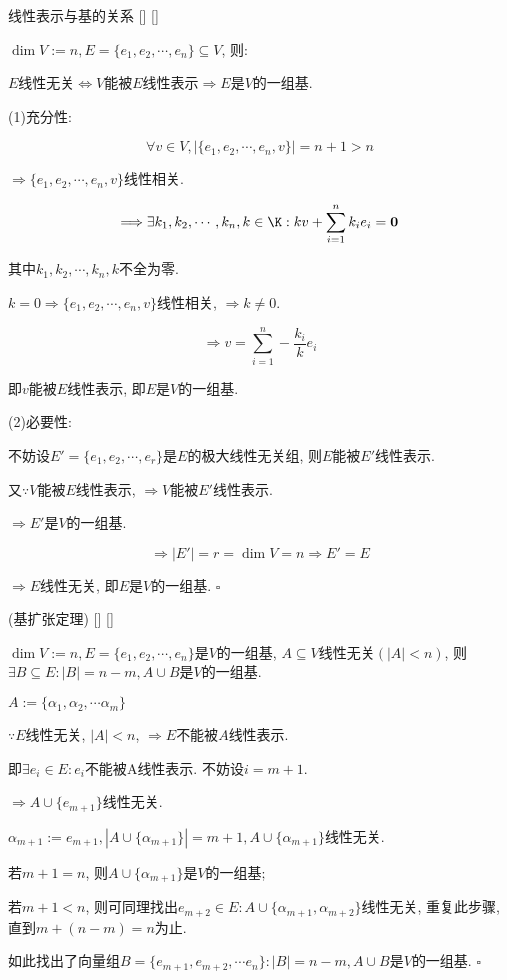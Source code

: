 \documentclass[UTF8]{ctexart}
\begin{document}
		\begin{ppt}
			[]
			{线性表示与基的关系}
			[]
			[]

			$\dim V:=n, E=\{e_{1},e_{2},\cdots,e_{n}\}\subseteq V$, 则: 
			
			$E$线性无关$\Longleftrightarrow V$能被$E$线性表示$\Longrightarrow E$是$V$的一组基. 
		\end{ppt}
		\begin{prf}
			
			(1)充分性: 
			
			$$\forall v\in V, |\{e_{1},e_{2},\cdots,e_{n}, v\}|=n+1>n$$
			
			$\Longrightarrow \{e_{1},e_{2},\cdots,e_{n}, v\}$线性相关. 
			
			$$\Longrightarrow \exists k_{1},k_{2},\cdots,k_{n},k\in\K: kv+\sum_{i=1}^{n}k_{i}e_{i}=\mathbf{0}$$
			
			其中$k_{1},k_{2},\cdots,k_{n},k$不全为零. 
			
			$k=0\Longrightarrow\{e_{1},e_{2},\cdots,e_{n}, v\}$线性相关, $\Longrightarrow k\neq 0$. 
			
			$$\Longrightarrow v=\sum_{i=1}^{n}-\frac{k_{i}}{k}e_{i}$$
			
			即$v$能被$E$线性表示, 即$E$是$V$的一组基. 
			
			(2)必要性: 
			
			不妨设$E'=\{e_{1},e_{2},\cdots,e_{r}\}$是$E$的极大线性无关组, 则$E$能被$E'$线性表示. 
			
			又$\because V$能被$E$线性表示, $\Longrightarrow V$能被$E'$线性表示. 
			
			$\Longrightarrow E'$是$V$的一组基. 
			
			$$\Longrightarrow |E'|=r=\dim V=n\Longrightarrow E'=E$$
			
			$\Longrightarrow E$线性无关, 即$E$是$V$的一组基. $\square$
		\end{prf}
		\begin{thm}
			[]
			{(基扩张定理)}
			[]
			[]

            $\dim V:=n, E=\{e_{1},e_{2},\cdots, e_{n}\}$是$V$的一组基, $A\subseteq V$线性无关$(|A|<n)$, 则$\exists B\subseteq E: |B|=n-m, A\cup B$是$V$的一组基. 
		\end{thm}
		\begin{prf}
			
			$A:=\{\alpha_{1},\alpha_{2},\cdots \alpha_{m}\}$
			
			$\because E$线性无关, $|A|<n$, $\Longrightarrow E$不能被$A$线性表示. 
			
			即$\exists e_{i}\in E: e_{i}$不能被{A}线性表示. 不妨设$i=m+1$. 
			
			$\Longrightarrow A\cup \{e_{m+1}\}$线性无关. 
			
			$\alpha_{m+1}:=e_{m+1}, |A\cup\{\alpha_{m+1}\}|=m+1, A\cup\{\alpha_{m+1}\}$线性无关. 
			
			若$m+1=n$, 则$A\cup\{\alpha_{m+1}\}$是$V$的一组基; 
			
			若$m+1<n$, 则可同理找出$e_{m+2}\in E: A\cup\{\alpha_{m+1}, \alpha_{m+2}\}$线性无关, 重复此步骤, 直到$m+(n-m)=n$为止. 
			
			如此找出了向量组$B=\{e_{m+1},e_{m+2},\cdots e_{n}\}: |B|=n-m, A\cup B$是$V$的一组基. $\square$
		\end{prf}
		
\end{document}
